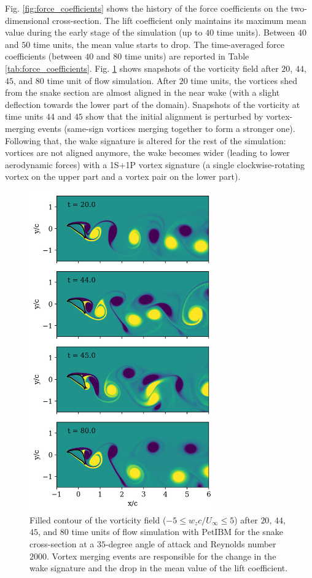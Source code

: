 \documentclass[10pt,journal,compsoc]{IEEEtran}
\begin{document}
Fig. \ref{fig:force_coefficients} shows the history of the force coefficients on the two-dimensional cross-section.
The lift coefficient only maintains its maximum mean value during the early stage of the simulation (up to $40$ time units).
Between $40$ and $50$ time units, the mean value starts to drop.
The time-averaged force coefficients (between $40$ and $80$ time units) are reported in Table \ref{tab:force_coefficients}.
Fig. \ref{fig:wz_2d} shows snapshots of the vorticity field after $20$, $44$, $45$, and $80$ time unit of flow simulation.
After $20$ time units, the vortices shed from the snake section are almost aligned in the near wake (with a slight deflection towards the lower part of the domain).
Snapshots of the vorticity at time units $44$ and $45$ show that the initial alignment is perturbed by vortex-merging events (same-sign vortices merging together to form a stronger one).
Following that, the wake signature is altered for the rest of the simulation: vortices are not aligned anymore, the wake becomes wider (leading to lower aerodynamic forces) with a 1S+1P vortex signature (a single clockwise-rotating vortex on the upper part and a vortex pair on the lower part).

\begin{figure}[!h]
    \centering
    \includegraphics[width=8cm]{figures/wz_multi_contourf.png}
    \caption{Filled contour of the vorticity field ($-5 \leq w_z c / U_\infty \leq 5$) after $20$, $44$, $45$, and $80$ time units of flow simulation with PetIBM for the snake cross-section at a $35$-degree angle of attack and Reynolds number $2000$. Vortex merging events are responsible for the change in the wake signature and the drop in the mean value of the lift coefficient.}
    \label{fig:wz_2d}
\end{figure}
\end{document}
